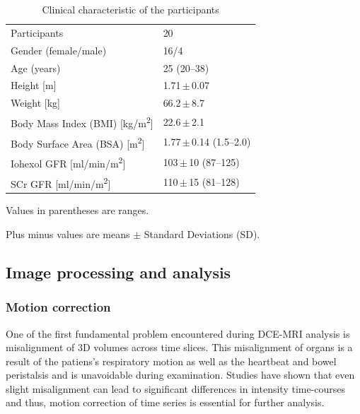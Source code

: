 \begin{table}[h!]
\centering
\caption[Clinical characteristic of the participants]{Clinical characteristic of the participants \cite{eikefjord2017dynamic}}
\label{tab:participants}
\begin{threeparttable}
\renewcommand{\arraystretch}{1.25}
\begin{tabular}{L{7cm} R{4cm}}
	\toprule

 	Participants & 20\\
  	Gender (female/male) &16/4\\
  	Age (years) & 25 (20--38)\\
  	Height [m] & 1.71\,$\pm$\,0.07\\
  	Weight [kg] & 66.2\,$\pm$\,8.7\\
  	Body Mass Index (BMI) [kg/m\textsuperscript{2}] & 22.6\,$\pm$\,2.1\\
  	Body Surface Area (BSA) [m\textsuperscript{2}]& 1.77\,$\pm$\,0.14 (1.5--2.0) \\
  	Iohexol GFR [ml/min/m\textsuperscript{2}] &103\,$\pm$\,10 (87--125)\\
  	SCr GFR [ml/min/m\textsuperscript{2}] & 110\,$\pm$\,15 (81--128)\\
  \bottomrule

\end{tabular}
\begin{tablenotes}%
\footnotesize{}%
\item Values in parentheses are ranges.
\item Plus minus values are means $\pm$ Standard Deviations (SD).
    \end{tablenotes}
	\end{threeparttable}
\end{table}

\subsection{Image processing and analysis}

\subsubsection{Motion correction}
One of the first fundamental problem encountered during DCE-MRI analysis is misalignment of 3D volumes across time slices. This misalignment of organs is a result of the patiens's respiratory motion as well as the heartbeat and bowel peristalsis and is unavoidable during examination. Studies have shown that even slight misalignment can lead to significant differences in intensity time-courses \cite{KidneySubsegmentation} and thus, motion correction of time series is essential for further analysis.

